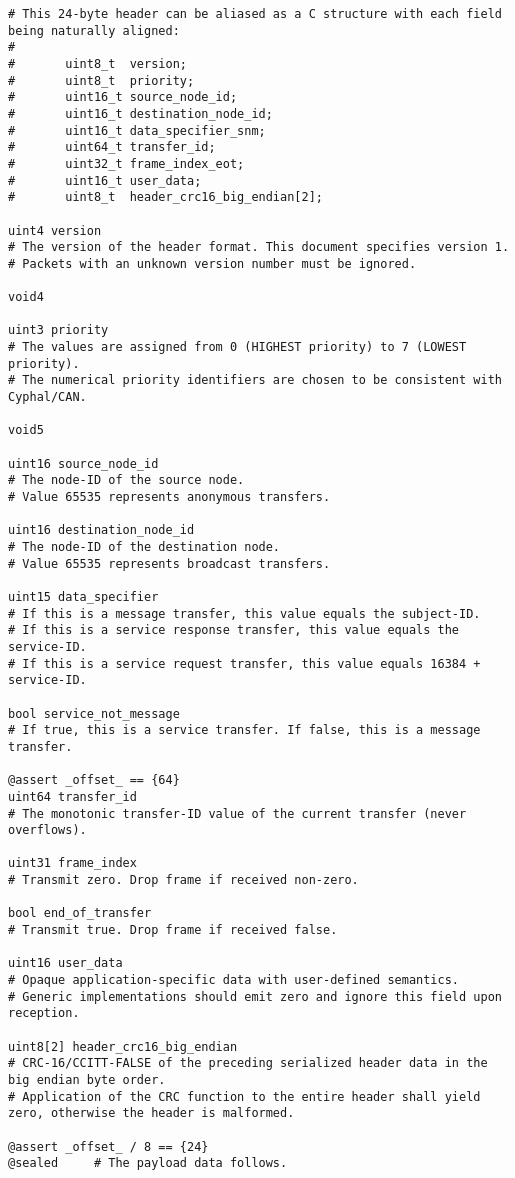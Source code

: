 \begin{samepage}
\begin{verbatim}
# This 24-byte header can be aliased as a C structure with each field being naturally aligned:
#
#       uint8_t  version;
#       uint8_t  priority;
#       uint16_t source_node_id;
#       uint16_t destination_node_id;
#       uint16_t data_specifier_snm;
#       uint64_t transfer_id;
#       uint32_t frame_index_eot;
#       uint16_t user_data;
#       uint8_t  header_crc16_big_endian[2];

uint4 version
# The version of the header format. This document specifies version 1.
# Packets with an unknown version number must be ignored.

void4

uint3 priority
# The values are assigned from 0 (HIGHEST priority) to 7 (LOWEST priority).
# The numerical priority identifiers are chosen to be consistent with Cyphal/CAN.

void5

uint16 source_node_id
# The node-ID of the source node.
# Value 65535 represents anonymous transfers.

uint16 destination_node_id
# The node-ID of the destination node.
# Value 65535 represents broadcast transfers.

uint15 data_specifier
# If this is a message transfer, this value equals the subject-ID.
# If this is a service response transfer, this value equals the service-ID.
# If this is a service request transfer, this value equals 16384 + service-ID.

bool service_not_message
# If true, this is a service transfer. If false, this is a message transfer.

@assert _offset_ == {64}
uint64 transfer_id
# The monotonic transfer-ID value of the current transfer (never overflows).

uint31 frame_index
# Transmit zero. Drop frame if received non-zero.

bool end_of_transfer
# Transmit true. Drop frame if received false.

uint16 user_data
# Opaque application-specific data with user-defined semantics.
# Generic implementations should emit zero and ignore this field upon reception.

uint8[2] header_crc16_big_endian
# CRC-16/CCITT-FALSE of the preceding serialized header data in the big endian byte order.
# Application of the CRC function to the entire header shall yield zero, otherwise the header is malformed.

@assert _offset_ / 8 == {24}
@sealed     # The payload data follows.
\end{verbatim}
\end{samepage}


